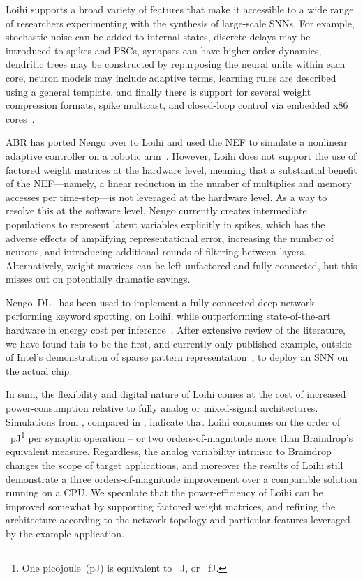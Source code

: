 Loihi supports a broad variety of features that make it accessible to a wide range of researchers experimenting with the synthesis of large-scale SNNs.
For example, stochastic noise can be added to internal states, discrete delays may be introduced to spikes and PSCs, synapses can have higher-order dynamics, dendritic trees may be constructed by repurposing the neural units within each core, neuron models may include adaptive terms, learning rules are described using a general template, and finally there is support for several weight compression formats, spike multicast, and closed-loop control via embedded x86 cores~\citep{davies2018loihi}.

ABR has ported Nengo over to Loihi and used the NEF to simulate a nonlinear adaptive controller on a robotic arm~\citep[][and personal communication]{dewolf2016}.
However, Loihi does not support the use of factored weight matrices at the hardware level, meaning that a substantial benefit of the NEF---namely, a linear reduction in the number of multiplies and memory accesses per time-step---is not leveraged at the hardware level.
As a way to resolve this at the software level, Nengo currently creates intermediate populations to represent latent variables explicitly in spikes, which has the adverse effects of amplifying representational error, increasing the number of neurons, and introducing additional rounds of filtering between layers.
Alternatively, weight matrices can be left unfactored and fully-connected, but this misses out on potentially dramatic savings.

Nengo~DL~\citep{rasmussen2018nengodl} has been used to implement a fully-connected deep network performing keyword spotting, on Loihi, while outperforming state-of-the-art hardware in energy cost per inference~\citep{blouw2018a}.
After extensive review of the literature, we have found this to be the first, and currently only published example, outside of Intel's demonstration of sparse pattern representation~\citep{tang2017sparse, davies2018loihi}, to deploy an SNN on the actual chip.

In sum, the flexibility and digital nature of Loihi comes at the cost of increased power-consumption relative to fully analog or mixed-signal architectures. 
Simulations from \citet[][Table~2]{davies2018loihi}, compared in \citet[][Table~3]{braindrop2019}, indicate that Loihi consumes on the order of ~pJ\footnote{
One picojoule~(pJ) is equivalent to ~J, or ~fJ.}
per synaptic operation -- or two orders-of-magnitude more than Braindrop's equivalent measure.
Regardless, the analog variability intrinsic to Braindrop changes the scope of target applications, and moreover the results of Loihi still demonstrate a three orders-of-magnitude improvement over a comparable solution running on a CPU.
We speculate that the power-efficiency of Loihi can be improved somewhat by supporting factored weight matrices, and refining the architecture according to the network topology and particular features leveraged by the example application.

